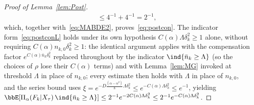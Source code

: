 \documentclass[11pt]{article}
\begin{document}
\begin{proof}[Proof of Lemma~\ref{lem:Post}]
\begin{align}
    \leq 4^{-1} + 4^{-1} = 2^{-1},
    \label{eq:MABDE9}
\end{align}
which, together with~\eqref{eq:MABDE2}, proves~\eqref{eq:postcon}. The indicator form~\eqref{eq:postconL} holds under its own hypothesis $C(\alpha) \Lambda \delta_k^2 \geq 1$ alone, without requiring $C(\alpha) n_{k,0} \delta_k^2 \geq 1$: the identical argument applies with the compensation factor $e^{C(\alpha)\bar n_k \delta_k^2}$ replaced throughout by the indicator $\ind\{\bar n_k \geq \Lambda\}$ (so the choices of $\rho$ lose their $C(\alpha)$ terms) and with Lemma~\ref{lem:MG} invoked at threshold $\Lambda$ in place of $n_{k,0}$; every estimate then holds with $\Lambda$ in place of $n_{k,0}$, and the series bound uses $\xi = e^{-D\frac{(\alpha-\alpha^2)}{8} \Lambda \delta_k^2} \leq e^{-C(\alpha) \Lambda \delta_k^2} \leq e^{-1}$, yielding $\bbE[\Pi_{\alpha}(F_k|X_{\tau})\, \ind\{\bar n_k \geq \Lambda\}] \leq 2^{-1} e^{-2C(\alpha) \Lambda \delta_k^2} \leq 2^{-1} e^{-C(\alpha) \Lambda \delta_k^2}$.
\end{proof}
\end{document}
